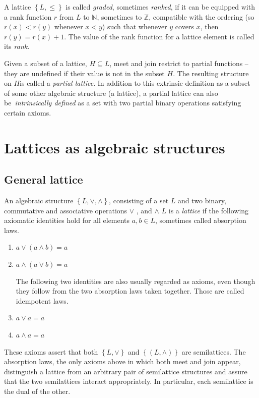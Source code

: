 \documentclass{conm-p-l}
\theoremstyle{definition}
\theoremstyle{remark}
\numberwithin{equation}{section}
\theoremstyle{plain}
\begin{document}
A lattice $\left\{ L,\leq \right\} $ is called \emph{graded}, sometimes 
\emph{ranked}, if it can be equipped with a rank function $r$ from $L$ to $%
\mathbb{N}
$, sometimes to $%
\mathbb{Z}
$, compatible with the ordering (so $r(x)<r(y)$ whenever $x<y$) such that
whenever $y$ covers $x$, then $r(y)=r(x)+1$. The value of the rank function
for a lattice element is called its \emph{rank}.

Given a subset of a lattice, $H\subseteq L$, meet and join restrict to
partial functions -- they are undefined if their value is not in the subset $%
H$. The resulting structure on $H$is called a \emph{partial lattice}. In
addition to this extrinsic definition as a subset of some other algebraic
structure (a lattice), a partial lattice can also be\emph{\ intrinsically
defined} as a set with two partial binary operations satisfying certain
axioms.

\section{Lattices as algebraic structures}

\subsection{General lattice}

An algebraic structure $\left\{ L,\vee ,\wedge \right\} $, consisting of a
set $L$  and two binary, commutative and associative operations $\vee $  ,
and $\wedge $ $L$ is a \emph{lattice} if the following axiomatic identities
hold for all elements $a,b\in L$, sometimes called absorption laws.

\begin{enumerate}
\item $a\vee (a\wedge b)=a$ 

\item $a\wedge (a\vee b)=a$ 

The following two identities are also usually regarded as axioms, even
though they follow from the two absorption laws taken together. Those are
called idempotent laws.

\item $a\vee a=a$

\item $a\wedge a=a$
\end{enumerate}

These axioms assert that both $\left\{ L,\vee \right\} $ and $\left\{
(L,\wedge )\right\} $ are semilattices. The absorption laws, the only axioms
above in which both meet and join appear, distinguish a lattice from an
arbitrary pair of semilattice structures and assure that the two
semilattices interact appropriately. In particular, each semilattice is the
dual of the other.
\end{document}
